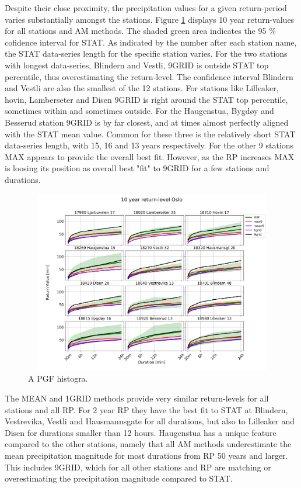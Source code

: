 Despite their close proximity, the precipitation values for a given return-period varies substantially amongst the stations. Figure \ref{fig:1985_all_stat} displays 10 year return-values for all stations and AM methods. The shaded green area indicates the 95 \% cofidence interval for STAT. As indicated by the number after each station name, the STAT data-series length for the specific station varies. For the two stations with longest data-series, Blindern and Vestli, 9GRID is outside STAT top percentile, thus overestimating the return-level. The confidence interval Blindern and Vestli are also the smallest of the 12 stations. For stations like Lilleaker, hovin, Lamberseter and Disen 9GRID is right around the STAT top percentile, sometimes within and sometimes outside. For the Haugenstua, Bygdøy and Besserud station 9GRID is by far closest, and at times almost perfectly aligned with the STAT mean value. Common for these three is the relatively short STAT data-series length, with 15, 16 and 13 years respectively. For the other 9 stations MAX appears to provide the overall best fit. However, as the RP increases MAX is loosing its position as overall best "fit" to 9GRID for a few stations and durations.           

\begin{figure}
    \begin{center}
        \includegraphics[width=20cm,height=8cm,keepaspectratio]{figures/10_ECE_1985_all_stat.png}
    \end{center}
    \caption{A PGF histogra.}
    \label{fig:1985_all_stat}
\end{figure}

The MEAN and 1GRID methods provide very similar return-levels for all stations and all RP. For 2 year RP they have the best fit to STAT at Blindern, Vestrevika, Vestli and Hausmannsgate for all durations, but also to Lilleaker and Disen for durations smaller than 12 hours. Haugenstua has a unique feature compared to the other stations, namely that all AM methods underestimate the mean precipitation magnitude for most durations from RP 50 years and larger. This includes 9GRID, which for all other stations and RP are matching or overestimating the precipitation magnitude compared to STAT. 

